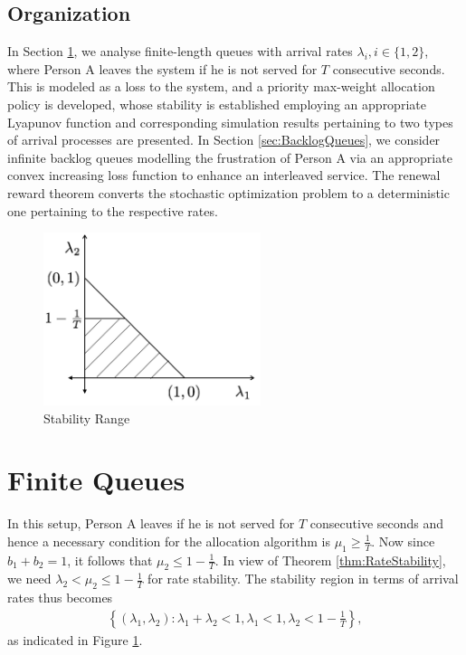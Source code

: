 \documentclass[10pt,a4paper]{article}
\begin{document}
\subsection{Organization}
In Section \ref{sec:FiniteQueues}, we analyse finite-length queues with arrival rates $\lambda_i, i \in\{1,2\}$, where Person A leaves the system if he is not served for $T$ consecutive seconds. This is modeled as a loss to the system, and a priority max-weight allocation policy is developed, whose stability is established employing an appropriate Lyapunov function and corresponding simulation results pertaining to two types of arrival processes are presented. In Section \ref{sec:BacklogQueues}, we consider infinite backlog queues modelling the frustration of Person A via an appropriate convex increasing loss function to enhance an interleaved service. The renewal reward theorem converts the stochastic optimization problem to a deterministic one pertaining to the respective rates.





\begin{figure}[b]
\centering
\includegraphics[width = 2.5in]{Figures/StabilityRange}
\caption{Stability Range}
\label{fig:StabilityRange}
\end{figure}

\section{Finite Queues }
\label{sec:FiniteQueues}
In this setup, Person A leaves if he is not served for $T$ consecutive seconds and hence a necessary condition for the allocation algorithm is $\mu_1\geq \frac{1}{T}.$ Now since $b_1 + b_2 = 1$, it follows that $\mu_2\leq 1-\frac{1}{T}$. In view of Theorem \ref{thm:RateStability}, we need $\lambda_2 < \mu_2\leq1-\frac{1}{T}$ for rate stability.
The stability region in terms of arrival rates thus becomes 
\begin{align*}
\left\{(\lambda_1,\lambda_2): \lambda_1+ \lambda_2 <1, \lambda_1<1, \lambda_2 < 1-\frac{1}{T}\right\},
\end{align*}
as indicated in Figure \ref{fig:StabilityRange}.
\end{document}
